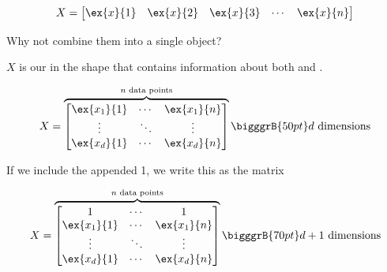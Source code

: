         \begin{equation}
            X =
                \begin{bmatrix}
                  \ex{x}{1} & \ex{x}{2} & \ex{x}{3} & \cdots & \ex{x}{n}
                \end{bmatrix}
        \end{equation}
        
        Why not combine them into a single object?\\
        
        \begin{kequation}
            $X$ is our  in the shape  that contains information about both  and .
            
            \begin{equation}
                X = 
                    \overbrace{
                        \begin{bmatrix}
                            \ex{x_1}{1} & \cdots  & \ex{x_1}{n} \\
                            \vdots      & \ddots & \vdots      \\
                            \ex{x_d}{1} & \cdots  & \ex{x_d}{n}
                        \end{bmatrix}
                        }^{ n \text{ data points}}
                    \bigggrB{50pt} d \text{ dimensions}
            \end{equation}

        \end{kequation}
        
        If we include the appended 1, we write this as the  matrix
        
        \begin{equation}
                X = 
                    \overbrace{
                        \begin{bmatrix}
                            1           & \cdots & 1           \\
                            \ex{x_1}{1} & \cdots  & \ex{x_1}{n} \\
                            \vdots      & \ddots & \vdots      \\
                            \ex{x_d}{1} & \cdots  & \ex{x_d}{n}
                        \end{bmatrix}
                        }^{ n \text{ data points}}
                    \bigggrB{70pt} d+1 \text{ dimensions}
        \end{equation}
        

